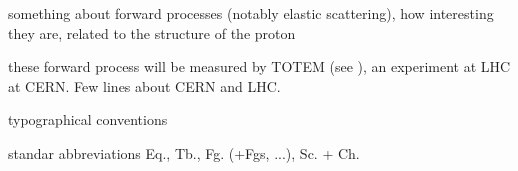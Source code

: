 
\> something about forward processes (notably elastic scattering), how interesting they are, related to the structure of the proton

\> these forward process will be measured by TOTEM (see ), an experiment at LHC at CERN. Few lines about CERN and LHC.

\> typographical conventions

\centerline{\vbox{}}

\> standar abbreviations Eq., Tb., Fg. (+Fgs, ...), Sc. + Ch.
